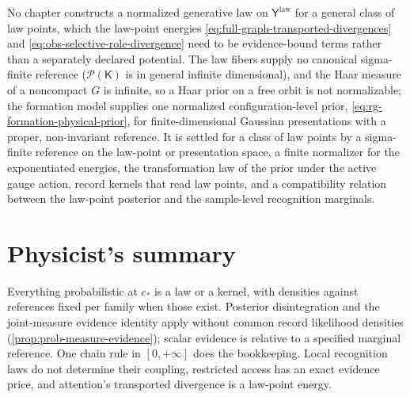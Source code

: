 No chapter constructs a normalized generative law on $\mathsf Y^{\mathrm{law}}$ for a general class of law
points, which the law-point energies \eqref{eq:full-graph-transported-divergences} and
\eqref{eq:obs-selective-role-divergence} need to be evidence-bound terms rather than a separately declared
potential. The law fibers supply no canonical sigma-finite reference ($\mathcal P(\mathsf K)$ is in general
infinite dimensional), and the Haar measure of a noncompact $G$ is infinite, so a Haar prior on a free orbit
is not normalizable; the formation model supplies one normalized configuration-level prior,
\eqref{eq:rg-formation-physical-prior}, for finite-dimensional Gaussian presentations with a proper,
non-invariant reference. It is settled for a class of law points by a sigma-finite reference on the law-point
or presentation space, a finite normalizer for the exponentiated energies, the transformation law of the prior
under the active gauge action, record kernels that read law points, and a compatibility relation between the
law-point posterior and the sample-level recognition marginals.

\section*{Physicist's summary}

Everything probabilistic at $c_*$ is a law or a kernel, with densities against references fixed per family
when those exist. Posterior disintegration and the joint-measure evidence
identity apply without common record likelihood densities
(\cref{prop:prob-measure-evidence}); scalar evidence is relative to a
specified marginal reference. One chain rule in $[0,+\infty]$ does the
bookkeeping. Local recognition laws do not determine their
coupling, restricted access has an exact evidence price, and attention's transported divergence is a
law-point energy.
